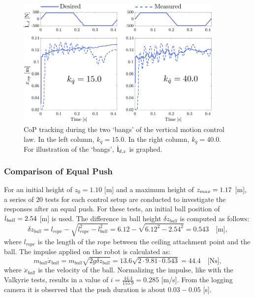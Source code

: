 \begin{figure}
\centering
\includegraphics[width=0.9\textwidth]{STYLESTUFF/atlascop.png}
\caption{\ac{CoP} tracking during the two `bangs' of the vertical motion control law. In the left column, $k_{\dot{q}}=15.0$. In the right column, $k_{\dot{q}}=40.0$. For illustration of the `bangs', $\dot{\mathbf{l}}_{d,z}$ is graphed. }
\label{fig:atlascop}
\end{figure}

\subsubsection{Comparison of Equal Push}
For an initial height of $z_0=1.10$ [m] and a maximum height of $z_{max}=1.17$ [m], a series of $20$ tests for each control setup are conducted to investigate the responses after an equal push. For these tests, an initial ball position of $l_{ball}=2.54$ [m] is used. The difference in ball height $\delta z_{ball}$ is computed as follows:
\begin{equation}
	\delta z_{ball} = l_{rope} - \sqrt{l_{rope}^2-l_{ball}^2} = 6.12-\sqrt{6.12^2 - 2.54^2} = 0.543 \quad \text{[m]},
\end{equation}
where $l_{rope}$ is the length of the rope between the ceiling attachment point and the ball. The impulse applied on the robot is calculated as:
\begin{equation}
m_{ball}\dot{x}_{ball} = m_{ball}\sqrt{2g\delta z_{ball} } = 13.6\sqrt{2 \cdot 9.81 \cdot 0.543} = 44.4 \quad \text{[Ns]},
\end{equation}
where $\dot{x}_{ball}$ is the velocity of the ball. Normalizing the impulse, like with the Valkyrie tests, results in a value of $i=\frac{44.4}{155.9}=0.285$ [m/s]. From the logging camera it is observed that the push duration is about $0.03-0.05$ [s].

